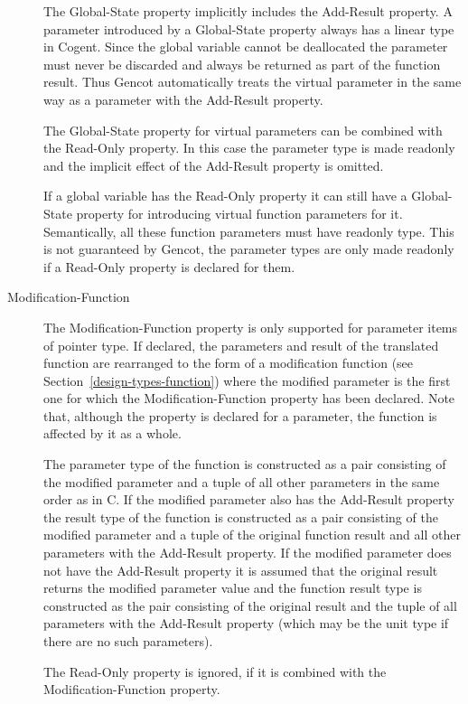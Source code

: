 \begin{description}
The Global-State property implicitly includes the Add-Result property. A parameter introduced 
by a Global-State property always has a linear type in Cogent. Since the global variable cannot be deallocated the parameter
must never be discarded and always be returned as part of the function result. Thus Gencot automatically treats the 
virtual parameter in the same way as a parameter with the Add-Result property.

The Global-State property for virtual parameters can be combined with the Read-Only property. In this case the 
parameter type is made readonly and the implicit effect of the Add-Result property is omitted.

If a global variable has the Read-Only property it can still have a Global-State property for introducing virtual
function parameters for it. Semantically, all these function parameters must have readonly type. This is not 
guaranteed by Gencot, the parameter types are only made readonly if a Read-Only property is declared for them.

\item[Modification-Function]

The Modification-Function property is only supported for parameter items of pointer type. If declared, the parameters and
result of the translated function are rearranged to the form of a modification function (see 
Section~\ref{design-types-function}) where the modified parameter is the first one for which the Modification-Function 
property has been declared. Note that, although the property is declared for a parameter, the function is affected
by it as a whole.

The parameter type of the function is constructed as a pair consisting of the modified parameter and a tuple of all 
other parameters in the same order as in C. If the modified parameter also has the Add-Result property the result type 
of the function is constructed as a pair consisting of the modified parameter and a tuple of the original function result
and all other parameters with the Add-Result property. If the modified parameter does not have the Add-Result property
it is assumed that the original result returns the modified parameter value and the function result type is constructed 
as the pair consisting of the original result and the tuple of all parameters with the Add-Result property (which may 
be the unit type if there are no such parameters).

The Read-Only property is ignored, if it is combined with the Modification-Function property.

\end{description}

